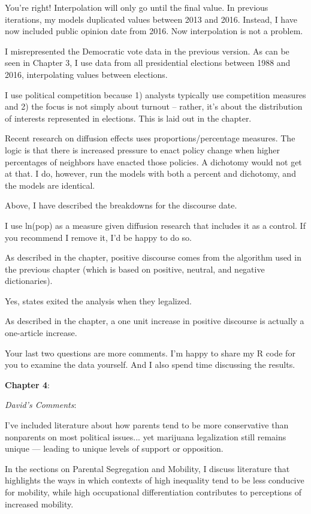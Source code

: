 \documentclass[12pt,stdletter,dateno,sigleft]{newlfm} %
\begin{document}
\begin{newlfm}
You're right! Interpolation will only go until the final value. In previous iterations, my models duplicated values between 2013 and 2016. Instead, I have now included public opinion date from 2016. Now interpolation is not a problem.

I misrepresented the Democratic vote data in the previous version. As can be seen in Chapter 3, I use data from all presidential elections between 1988 and 2016, interpolating values between elections. 

I use political competition because 1) analysts typically use competition measures and 2) the focus is not simply about turnout -- rather, it's about the distribution of interests represented in elections. This is laid out in the chapter. 

Recent research on diffusion effects uses proportions/percentage measures. The logic is that there is increased pressure to enact policy change when higher percentages of neighbors have enacted those policies. A dichotomy would not get at that. I do, however, run the models with both a percent and dichotomy, and the models are identical. 

Above, I have described the breakdowns for the discourse date. 

I use ln(pop) as a measure given diffusion research that includes it as a control. If you recommend I remove it, I'd be happy to do so. 

As described in the chapter, positive discourse comes from the algorithm used in the previous chapter (which is based on positive, neutral, and negative dictionaries). 

Yes, states exited the analysis when they legalized. 

As described in the chapter, a one unit increase in positive discourse is actually a one-article increase. 

Your last two questions are more comments. I'm happy to share my R code for you to examine the data yourself. And I also spend time discussing the results. 


\textbf{Chapter 4}: 

\textit{David's Comments}:

I've included literature about how parents tend to be more conservative than nonparents on most political issues... yet marijuana legalization still remains unique --- leading to unique levels of support or opposition. 

In the sections on Parental Segregation and Mobility, I discuss literature that highlights the ways in which contexts of high inequality tend to be less conducive for mobility, while high occupational differentiation contributes to perceptions of increased mobility. \newline



\end{newlfm}
\end{document}
